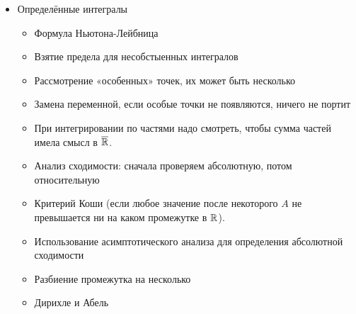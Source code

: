 \documentclass[12pt, a4paper]{article}
\begin{document}
\begin{itemize}
    \item Определённые интегралы
    \begin{itemize}
      \item Формула Ньютона-Лейбница
      \item Взятие предела для несобстыенных интегралов
      \item Рассмотрение «особенных» точек, их может быть несколько
      \item Замена переменной, если особые точки не появляются, ничего не портит
      \item При интегрировании по частями надо смотреть, чтобы сумма частей имела смысл в $\overline{{\mathbb{R}}}$.
      \item Анализ сходимости: сначала проверяем абсолютную, потом относительную
      \item Критерий Коши (если любое значение после некоторого $A$ не превышается ни на каком промежутке в ${\mathbb{R}}$).
      \item Использование асимптотического анализа для определения абсолютной сходимости
      \item Разбиение промежутка на несколько
      \item Дирихле и Абель
    \end{itemize}
  \end{itemize}
\end{document}
